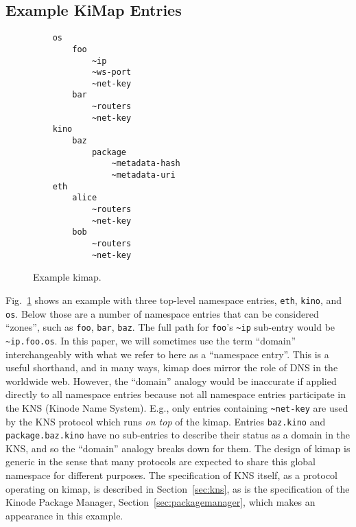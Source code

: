\documentclass[runningheads]{llncs}
\begin{document}

\subsection{Example KiMap Entries}

\begin{figure}[H]
    \centering
    \begin{lstlisting}
    os
        foo
            ~ip
            ~ws-port
            ~net-key
        bar
            ~routers
            ~net-key
    kino
        baz
            package
                ~metadata-hash
                ~metadata-uri
    eth
        alice
            ~routers
            ~net-key
        bob
            ~routers
            ~net-key
    \end{lstlisting}
    \caption{Example kimap.}
    \label{fig:example kimap}
\end{figure}

Fig.~\ref{fig:example kimap} shows an example with three top-level namespace entries, \verb|eth|, \verb|kino|, and \verb|os|.
Below those are a number of namespace entries that can be considered ``zones'', such as \verb|foo|, \verb|bar|, \verb|baz|.
The full path for \verb|foo|'s \verb|~ip| sub-entry would be \verb|~ip.foo.os|.
In this paper, we will sometimes use the term ``domain'' interchangeably with what we refer to here as a ``namespace entry''.
This is a useful shorthand, and in many ways, kimap does mirror the role of DNS in the worldwide web.
However, the ``domain'' analogy would be inaccurate if applied directly to all namespace entries because not all namespace entries participate in the KNS (Kinode Name System).
E.g., only entries containing \verb|~net-key| are used by the KNS protocol which runs \textit{on top} of the kimap.
Entries \verb|baz.kino| and \verb|package.baz.kino| have no sub-entries to describe their status as a domain in the KNS, and so the ``domain'' analogy breaks down for them.
The design of kimap is generic in the sense that many protocols are expected to share this global namespace for different purposes.
The specification of KNS itself, as a protocol operating on kimap, is described in Section~\ref{sec:kns}, as is the specification of the Kinode Package Manager, Section~\ref{sec:packagemanager}, which makes an appearance in this example.
\end{document}
